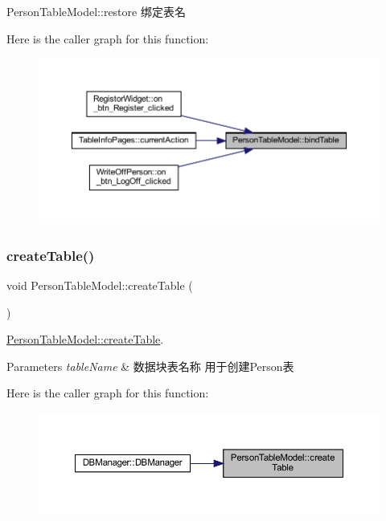 Person\+Table\+Model\+::restore 绑定表名 

Here is the caller graph for this function\+:
\nopagebreak
\begin{figure}[H]
\begin{center}
\leavevmode
\includegraphics[width=350pt]{class_person_table_model_a4abbde77bb6256c11d464d59c77878e4_icgraph}
\end{center}
\end{figure}
\mbox{\label{class_person_table_model_a121018cb2905e38572a05c457e9fda35}} 
\subsubsection{\texorpdfstring{createTable()}{createTable()}}
{\footnotesize\ttfamily void Person\+Table\+Model\+::create\+Table (\begin{DoxyParamCaption}{ }\end{DoxyParamCaption})}



\mbox{\hyperlink{class_person_table_model_a121018cb2905e38572a05c457e9fda35}{Person\+Table\+Model\+::create\+Table}}. 


\begin{DoxyParams}{Parameters}
{\em table\+Name} & 数据块表名称 用于创建\+Person表 \\
\hline
\end{DoxyParams}
Here is the caller graph for this function\+:
\nopagebreak
\begin{figure}[H]
\begin{center}
\leavevmode
\includegraphics[width=350pt]{class_person_table_model_a121018cb2905e38572a05c457e9fda35_icgraph}
\end{center}
\end{figure}
\mbox{\label{class_person_table_model_a23ae24fe86e68f54a2d3259c924e122c}} 
